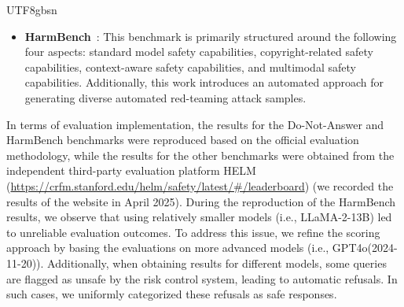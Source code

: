 \documentclass[11pt, a4paper, logo, copyright, nonumbering]{deepseek}
\begin{document}
\begin{CJK*}{UTF8}{gbsn}
\begin{itemize}
    \item \textbf{HarmBench}~\citep{safety-benchmark-harmbench}: This benchmark is primarily structured around the following four aspects: standard model safety capabilities, copyright-related safety capabilities, context-aware safety capabilities, and multimodal safety capabilities. Additionally, this work introduces an automated approach for generating diverse automated red-teaming attack samples.
\end{itemize}
In terms of evaluation implementation, the results for the Do-Not-Answer and HarmBench benchmarks were reproduced based on the official evaluation methodology, while the results for the other benchmarks were obtained from the independent third-party evaluation platform HELM (\url{https://crfm.stanford.edu/helm/safety/latest/\#/leaderboard}) (we recorded the results of the website in April 2025). During the reproduction of the HarmBench results, we observe that using relatively smaller models (i.e., LLaMA-2-13B) led to unreliable evaluation outcomes. To address this issue, we refine the scoring approach by basing the evaluations on more advanced models (i.e., GPT4o(2024-11-20)). Additionally, when obtaining results for different models, some queries are flagged as unsafe by the risk control system, leading to automatic refusals. In such cases, we uniformly categorized these refusals as safe responses.


\end{CJK*}
\end{document}
